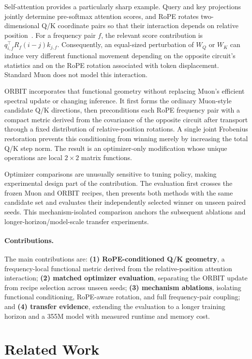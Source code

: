 \documentclass[10pt]{article}
\begin{document}
Self-attention provides a particularly sharp example. Query and key projections jointly
determine pre-softmax attention scores, and RoPE rotates two-dimensional Q/K coordinate
pairs so that their interaction depends on relative position~\cite{su2021roformer}. For a
frequency pair $f$, the relevant score contribution is
$q_{i,f}^{\top}R_f(i-j)k_{j,f}$. Consequently, an equal-sized perturbation of $W_Q$ or
$W_K$ can induce very different functional movement depending on the opposite circuit's
statistics and on the RoPE rotation associated with token displacement. Standard Muon does
not model this interaction.

ORBIT incorporates that functional geometry without replacing Muon's efficient spectral
update or changing inference. It first forms the ordinary
Muon-style candidate Q/K directions, then preconditions each RoPE frequency pair with a
compact metric derived from the covariance of the opposite circuit after transport through a
fixed distribution of relative-position rotations. A single joint Frobenius restoration
prevents this conditioning from winning merely by increasing the total Q/K step norm. The
result is an optimizer-only modification whose unique operations are local $2\times2$
matrix functions.

Optimizer comparisons are unusually sensitive to tuning policy, making experimental design
part of the contribution. The evaluation first crosses the frozen Muon and ORBIT recipes,
then presents both methods with the same candidate set and evaluates their independently
selected winner on unseen paired seeds. This mechanism-isolated comparison anchors the
subsequent ablations and longer-horizon/model-scale transfer experiments.

\paragraph{Contributions.}
The main contributions are:
\textbf{(1) RoPE-conditioned Q/K geometry}, a frequency-local functional metric derived
from the relative-position attention interaction;
\textbf{(2) matched optimizer evaluation}, separating the ORBIT update from recipe
selection across unseen seeds;
\textbf{(3) mechanism ablations}, isolating functional conditioning, RoPE-aware rotation,
and full frequency-pair coupling; and
\textbf{(4) transfer evidence}, extending the evaluation to a longer training horizon and
a 355M model with measured runtime and memory cost.

\section{Related Work}
\end{document}
